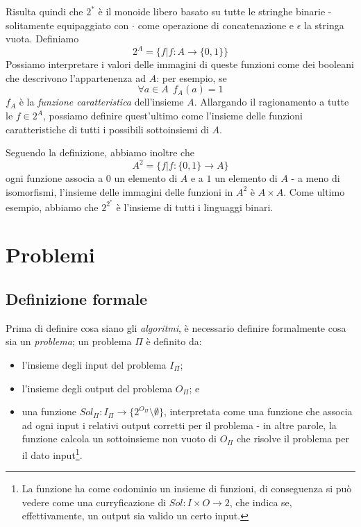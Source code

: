 Risulta quindi che $2^*$ è il monoide libero basato su tutte le stringhe binarie -
solitamente equipaggiato con $\cdot$ come operazione di concatenazione e $\epsilon$ la
stringa vuota. Definiamo
$$
	2^A = \{f | f: A \rightarrow \{0,1\}\}
$$
Possiamo interpretare i valori delle immagini di queste funzioni come dei booleani
che descrivono l'appartenenza ad $A$: per esempio, se
$$
	\forall a \in A ~~ f_A (a) = 1
$$
$f_A$ è la \textit{funzione caratteristica} dell'insieme $A$. Allargando il
ragionamento a tutte le $f \in 2^A$, possiamo definire quest'ultimo come l'insieme
delle funzioni caratteristiche di tutti i possibili sottoinsiemi di $A$.

Seguendo la definizione, abbiamo inoltre che
$$
	A^2 = \{f| f: \{0,1\} \rightarrow A\}
$$
ogni funzione associa a $0$ un elemento di $A$ e a $1$ un elemento di $A$ - a meno di isomorfismi,
l'insieme delle immagini delle funzioni in $A^2$ è $A \times A$.
Come ultimo esempio, abbiamo che $2^{2^*}$ è l'insieme di tutti i linguaggi
binari.

\section{Problemi}
\subsection{Definizione formale}
Prima di definire cosa siano gli \textit{algoritmi}, è necessario definire
formalmente cosa sia un \textit{problema}; un problema $\Pi$ è definito da:
\begin{itemize}
	\setlength\itemsep{0pt}
	\item l'insieme degli input del problema $I_{\Pi}$;
	\item l'insieme degli output del problema $O_{\Pi}$; e
	\item una funzione $Sol_{\Pi}: I_{\Pi} \rightarrow \{2^{O_{\Pi}} \setminus \emptyset\}$,
	      interpretata come una funzione che associa ad ogni input i relativi
	      output corretti per il problema - in altre parole, la funzione calcola
	      un sottoinsieme non vuoto di $O_{\Pi}$ che risolve il problema per il dato input\footnote{
		      La funzione ha come codominio un insieme di funzioni, di conseguenza
		      si può vedere come una curryficazione di $Sol: I \times O \rightarrow 2$, che indica se,
		      effettivamente, un output sia valido un certo input.}.

\end{itemize}

